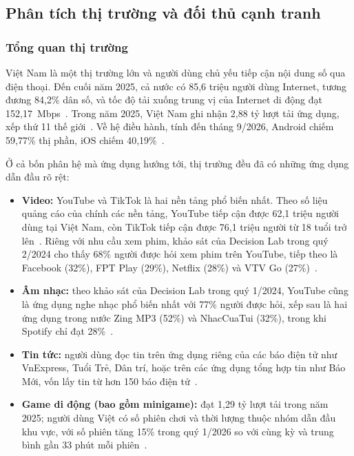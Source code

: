 \subsection{Phân tích thị trường và đối thủ cạnh tranh}
\label{sec:market-research}

\subsubsection{Tổng quan thị trường}

Việt Nam là một thị trường lớn và người dùng chủ yếu tiếp cận nội dung số qua điện thoại.
Đến cuối năm 2025, cả nước có 85,6 triệu người dùng Internet, tương đương 84,2\% dân số, và tốc độ tải xuống trung vị của Internet di động đạt 152,17~Mbps~\cite{datareportal2026vn}.
Trong năm 2025, Việt Nam ghi nhận 2,88 tỷ lượt tải ứng dụng, xếp thứ 11 thế giới~\cite{tuoitre-gamedownloads2026}.
Về hệ điều hành, tính đến tháng 9/2026, Android chiếm 59,77\% thị phần, iOS chiếm 40,19\%~\cite{statcounter-vn}.

Ở cả bốn phân hệ mà ứng dụng hướng tới, thị trường đều đã có những ứng dụng dẫn đầu rõ rệt:
\begin{itemize}
    \item \textbf{Video:} YouTube và TikTok là hai nền tảng phổ biến nhất.
    Theo số liệu quảng cáo của chính các nền tảng, YouTube tiếp cận được 62,1 triệu người dùng tại Việt Nam, còn TikTok tiếp cận được 76,1 triệu người từ 18 tuổi trở lên~\cite{datareportal2026vn}.
    Riêng với nhu cầu xem phim, khảo sát của Decision Lab trong quý 2/2024 cho thấy 68\% người được hỏi xem phim trên YouTube, tiếp theo là Facebook (32\%), FPT Play (29\%), Netflix (28\%) và VTV Go (27\%)~\cite{vneconomy-streaming2024}.
    \item \textbf{Âm nhạc:} theo khảo sát của Decision Lab trong quý 1/2024, YouTube cũng là ứng dụng nghe nhạc phổ biến nhất với 77\% người được hỏi, xếp sau là hai ứng dụng trong nước Zing MP3 (52\%) và NhacCuaTui (32\%), trong khi Spotify chỉ đạt 28\%~\cite{decisionlab-music2024}.
    \item \textbf{Tin tức:} người dùng đọc tin trên ứng dụng riêng của các báo điện tử như VnExpress, Tuổi Trẻ, Dân trí, hoặc trên các ứng dụng tổng hợp tin như Báo Mới, vốn lấy tin từ hơn 150 báo điện tử~\cite{baomoi-appstore}.
    \item \textbf{Game di động (bao gồm minigame):} đạt 1,29 tỷ lượt tải trong năm 2025; người dùng Việt có số phiên chơi và thời lượng thuộc nhóm dẫn đầu khu vực, với số phiên tăng 15\% trong quý 1/2026 so với cùng kỳ và trung bình gần 33 phút mỗi phiên~\cite{tuoitre-gamedownloads2026,adjust2026vn}.
\end{itemize}

